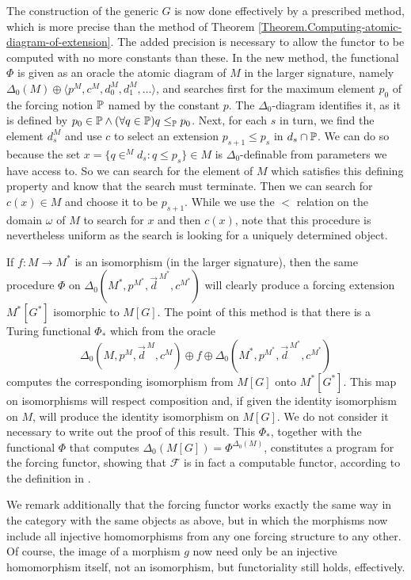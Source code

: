 \documentclass{amsart}
\begin{document}
The construction of the generic $G$ is now done effectively by a prescribed method, which is
more precise than the method of Theorem \ref{Theorem.Computing-atomic-diagram-of-extension}.
The added precision is necessary to allow the functor to be computed with no more constants than these.
In the new method, the functional $\Phi$ is given as an oracle the atomic diagram of $M$
in the larger signature, namely $\Delta_0(M)\oplus\langle p^M,c^M,d_0^M,d_1^M,\ldots\rangle$,
and searches first for the maximum element $p_0$ of the forcing notion $\P$
named by the constant $p$.  The $\Delta_0$-diagram identifies it, as it is defined by
$p_0\in\P \land (\forall q\in\P) q\leq_{\P}p_0$.  Next, for each $s$ in turn, we find the
element $d_s^M$ and use $c$ to select an extension $p_{s+1}\leq p_s$
in $d_s\cap\P$. We can do so because the set $x = \{ q \in^M d_s : q \le p_s \} \in M$ is $\Delta_0$-definable from parameters we have access to. So we can search for the element of $M$ which satisfies this defining property and know that the search must terminate. Then we can search for $c(x) \in M$ and choose it to be $p_{s+1}$.
While we use the $<$ relation on the domain $\omega$ of $M$ to search for $x$ and then $c(x)$, note that this procedure is nevertheless uniform as the search is looking for a uniquely determined object.


If $f:M \to M^*$ is an isomorphism (in the larger signature),
then the same procedure $\Phi$ on $\Delta_0(M^*,p^{M^*},\vec{d}^{\,M^*},c^{M^*})$
will clearly produce a forcing extension $M^*[G^*]$ isomorphic to $M[G]$.
The point of this method is that there is a Turing functional $\Phi_*$ which
from the oracle
$$\Delta_0(M,p^M,\vec{d}^{\,M},c^M)\oplus f \oplus \Delta_0(M^*,p^{M^*},\vec{d}^{\,M^*},c^{M^*})$$
computes the corresponding isomorphism from $M[G]$ onto $M^*[G^*]$.
This map on isomorphisms will respect composition and, if given the identity
isomorphism on $M$, will produce the identity isomorphism on $M[G]$.
We do not consider it necessary to write out the proof of this result.
This $\Phi_*$, together with the functional $\Phi$ that computes $\Delta_0(M[G]) = \Phi^{\Delta_0(M)}$,
constitutes a program for the forcing functor, showing that
$\mathcal{F}$ is in fact a computable functor, according to the definition in \cite{MPSS}.

We remark additionally that the forcing functor works exactly the same way
in the category with the same objects as above, but in which the morphisms now include
all injective homomorphisms from any one forcing structure to any other.
Of course, the image of a morphism $g$ now need only be an injective homomorphism itself,
not an isomorphism, but functoriality still holds, effectively.
\end{document}
